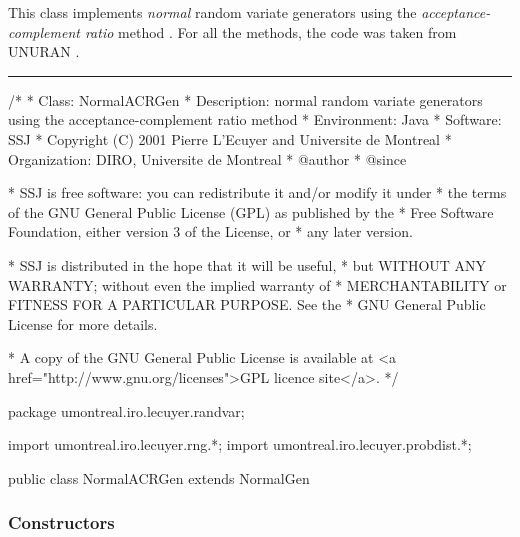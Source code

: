 
This class implements {\em normal\/} random variate generators using
the {\em acceptance-complement ratio\/} method \cite{rHOR90a}. 
For all the methods, the code was taken from UNURAN \cite{iLEY02a}.


\bigskip\hrule

\begin{code}
\begin{hide}
/*
 * Class:        NormalACRGen
 * Description:  normal random variate generators using the
                 acceptance-complement ratio method
 * Environment:  Java
 * Software:     SSJ 
 * Copyright (C) 2001  Pierre L'Ecuyer and Universite de Montreal
 * Organization: DIRO, Universite de Montreal
 * @author       
 * @since

 * SSJ is free software: you can redistribute it and/or modify it under
 * the terms of the GNU General Public License (GPL) as published by the
 * Free Software Foundation, either version 3 of the License, or
 * any later version.

 * SSJ is distributed in the hope that it will be useful,
 * but WITHOUT ANY WARRANTY; without even the implied warranty of
 * MERCHANTABILITY or FITNESS FOR A PARTICULAR PURPOSE.  See the
 * GNU General Public License for more details.

 * A copy of the GNU General Public License is available at
   <a href="http://www.gnu.org/licenses">GPL licence site</a>.
 */
\end{hide}
package umontreal.iro.lecuyer.randvar;\begin{hide}
import umontreal.iro.lecuyer.rng.*;
import umontreal.iro.lecuyer.probdist.*;
\end{hide}

public class NormalACRGen extends NormalGen \begin{hide} {

\end{hide}\end{code}

\subsubsection* {Constructors}

